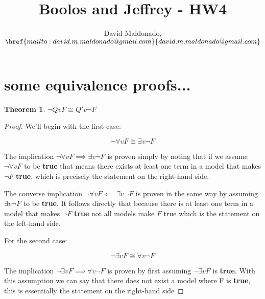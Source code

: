 \documentclass[a4paper,11pt]{article}
\author{David Maldonado, $\href{mailto:david.m.maldonado@gmail.com}%
{david.m.maldonado@gmail.com}$}
\title{Boolos and Jeffrey - HW4}
\newtheorem{thm}{Theorem}[section]
\begin{document}
\maketitle

\bigskip


\section{some equivalence proofs...} 

\begin{thm}$\lnot Qv F \cong Q'v \lnot F $\end{thm}
	
	\begin{proof}
		We'll begin with the first case: 
		
		\begin{equation} \lnot \forall v F \cong \exists v \lnot F \end{equation}
		
		The implication $\lnot \forall v F \implies \exists v \lnot F$ is proven simply by noting that if we assume 
		$\lnot \forall v F$ to be \textbf{true} that means there exists at least one term in a model that makes 
		$\lnot F$ \textbf{true}, which is precisely the statement on the right-hand side.
		
		The converse implication $\lnot \forall v F \impliedby \exists v \lnot F$ is proven in the same way by
		assuming $\exists v \lnot F$ to be \textbf{true}. It follows directly that because there is at least one term
		in a model that makes $\lnot F$ \textbf{true} not all models make $F$ true which is the statement 			on the left-hand side.
		
		\bigskip
		
		For the second case:
		
		\begin{equation} \lnot \exists v F \cong \forall v \lnot F \end{equation}
		
		The implication $\lnot \exists v F \implies \forall v \lnot F$ is proven by first assuming $\lnot \exists v F$ 
		is \textbf{true}. With this assumption we can say that there does not exist a model where F is 
		\textbf{true}, this is essentially the statement on the right-hand side
	\end{proof}
	
\setcounter{equation}{0}
	
	
\end{document}
